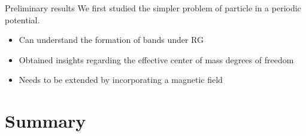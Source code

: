 \documentclass[12pt,aspectratio=169]{beamer}
\begin{document}
\begin{frame}{Preliminary results}
We first studied the simpler problem of \alert{particle in a periodic potential}.

\vspace*{\fill}

\vspace*{\fill}
	
\begin{itemize}
	\item Can understand the formation of bands under RG
	\item Obtained insights regarding the \alert{effective center of mass} degrees of freedom
	\item Needs to be extended by incorporating a \alert{magnetic field}
\end{itemize}
\end{frame}

\section{Summary}
\subsection{~}
\end{document}
